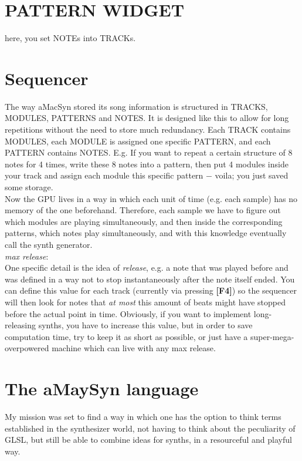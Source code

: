\documentclass[11pt]{article}
\begin{document}
\section{PATTERN WIDGET}
    here, you set NOTEs into TRACKs.
    \begin{itemize}
    \end{itemize}
   
\section{Sequencer}
  The way aMacSyn stored its song information is structured in TRACKS, MODULES, PATTERNS and NOTES. It is designed like this to allow for long repetitions without the need to store much redundancy. Each TRACK contains MODULES, each MODULE is assigned one specific PATTERN, and each PATTERN contains NOTES. E.g. If you want to repeat a certain structure of 8 notes for 4 times, write these 8 notes into a pattern, then put 4 modules inside your track and assign each module this specific pattern $-$ voila; you just saved some storage.\\
  
  \noindent
  Now the GPU lives in a way in which each unit of time (e.g. each sample) has no memory of the one beforehand. Therefore, each sample we have to figure out which modules are playing simultaneously, and then inside the corresponding patterns, which notes play simultaneously, and with this knowledge eventually call the synth generator.\\
  
  \noindent
  \emph{max release}:\\
  One specific detail is the idea of \emph{release}, e.g. a note that was played before and was defined in a way not to stop instantaneously after the note itself ended. You can define this value for each track (currently via pressing \textbf{[F4]}) so the sequencer will then look for notes that \emph{at most} this amount of beats might have stopped before the actual point in time. Obviously, if you want to implement long-releasing synths, you have to increase this value, but in order to save computation time, try to keep it as short as possible, or just have a super-mega-overpowered machine which can live with any max release.
  
\section{The aMaySyn language}
  My mission was set to find a way in which one has the option to think terms established in the synthesizer world, not having to think about the peculiarity of GLSL, but still be able to combine ideas for synths, in a resourceful and playful way.\\
  
\end{document}
